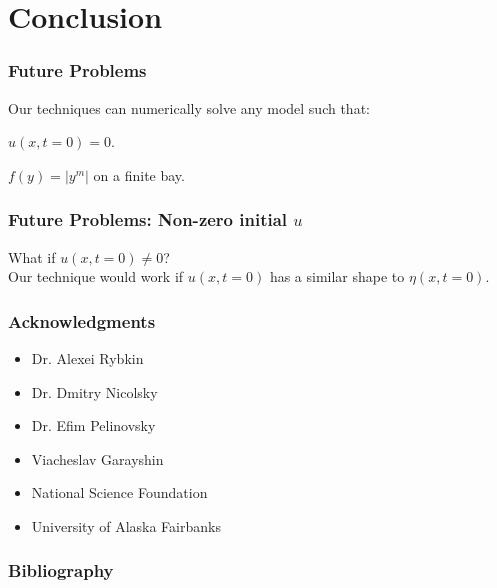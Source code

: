 
\section{Conclusion}
	\begin{frame}
		\frametitle{Future Problems}
		Our techniques can numerically solve any model such that:
		\be
			\item $u(x,t=0) = 0$.
			\item $f(y)=|y^m|$ on a finite bay.
		\ee
	\end{frame}
	
	\begin{frame}
		\frametitle{Future Problems: Non-zero initial $u$}
		What if $u(x,t=0) \neq 0$?\\
		Our technique would work if $u(x,t=0)$ has a similar shape to $\eta(x,t=0)$.
	\end{frame}



	\begin{frame}
		\frametitle{Acknowledgments}
	
		\begin{itemize}
		\item Dr. Alexei Rybkin  
		\item Dr. Dmitry Nicolsky
		\item Dr. Efim Pelinovsky
		\item Viacheslav Garayshin
		\item National Science Foundation
		\item University of Alaska Fairbanks
		\end{itemize}
		\end{frame}
	
		\begin{frame}[allowframebreaks]
		\nocite{*}
		\frametitle{Bibliography}
		
		
	\end{frame}